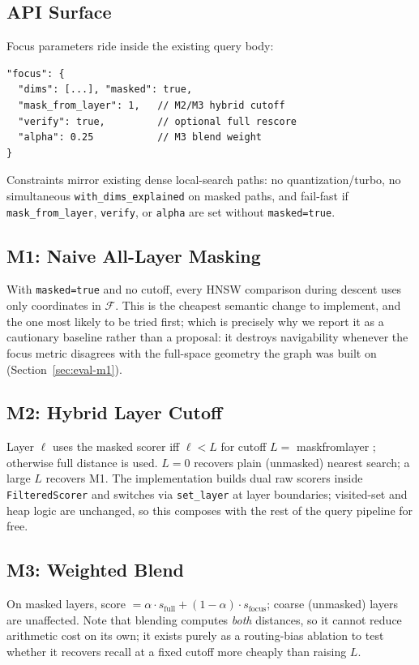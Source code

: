 \documentclass[sigconf,review,balance=false]{acmart}
\newcommand{\breakablecode}[1]{%
  {\ttfamily
    \renewcommand{\_}{\textunderscore\allowbreak}%
    #1%
  }}
\begin{document}
\subsection{API Surface}

Focus parameters ride inside the existing query body:
\begin{verbatim}
"focus": {
  "dims": [...], "masked": true,
  "mask_from_layer": 1,   // M2/M3 hybrid cutoff
  "verify": true,         // optional full rescore
  "alpha": 0.25           // M3 blend weight
}
\end{verbatim}
Constraints mirror existing dense local-search paths: no quantization/turbo, no
simultaneous \texttt{with\_dims\_explained} on masked paths, and fail-fast if
\texttt{mask\_from\_layer}, \texttt{verify}, or \texttt{alpha} are set without
\texttt{masked=true}.

\subsection{M1: Naive All-Layer Masking}

With \texttt{masked=true} and no cutoff, every HNSW comparison during descent
uses only coordinates in $\mathcal{F}$. This is the cheapest semantic change to
implement, and the one most likely to be tried first; which is precisely why
we report it as a cautionary baseline rather than a proposal: it destroys
navigability whenever the focus metric disagrees with the full-space geometry
the graph was built on (Section~\ref{sec:eval-m1}).

\subsection{M2: Hybrid Layer Cutoff}

Layer $\ell$ uses the masked scorer iff $\ell < L$ for cutoff
$L ={}$\breakablecode{mask\_from\_layer}; otherwise full distance is used.
$L{=}0$ recovers plain (unmasked) nearest search; a large $L$ recovers M1.
The implementation builds dual raw scorers inside \texttt{FilteredScorer}
and switches via \texttt{set\_layer} at layer boundaries; visited-set and
heap logic are unchanged, so this composes with the rest of the query
pipeline for free.

\subsection{M3: Weighted Blend}

On masked layers, score $= \alpha \cdot s_{\mathrm{full}} + (1-\alpha)\cdot
s_{\mathrm{focus}}$; coarse (unmasked) layers are unaffected. Note that
blending computes \emph{both} distances, so it cannot reduce arithmetic cost on
its own; it exists purely as a routing-bias ablation to test whether it
recovers recall at a fixed cutoff more cheaply than raising $L$.
\end{document}
